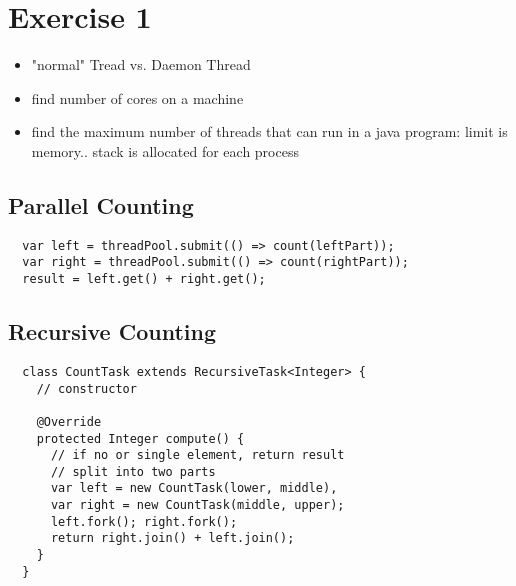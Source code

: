 \section{Exercise 1}

\begin{itemize}
  \item "normal" Tread vs. Daemon Thread
  \item find number of cores on a machine
  \item find the maximum number of threads that can run in a java program: limit is memory.. stack is allocated for each process
\end{itemize}


\subsection*{Parallel Counting}
\begin{lstlisting}
  var left = threadPool.submit(() => count(leftPart));
  var right = threadPool.submit(() => count(rightPart));
  result = left.get() + right.get();
\end{lstlisting}

\subsection*{Recursive Counting}
\begin{lstlisting}
  class CountTask extends RecursiveTask<Integer> {
    // constructor

    @Override
    protected Integer compute() {
      // if no or single element, return result
      // split into two parts
      var left = new CountTask(lower, middle),
      var right = new CountTask(middle, upper);
      left.fork(); right.fork();
      return right.join() + left.join();
    }
  }
\end{lstlisting}

